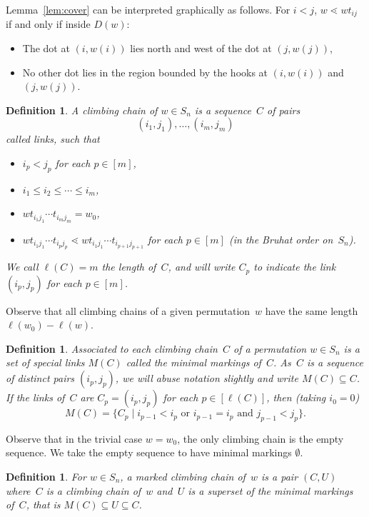 \documentclass[10pt,a4paper]{amsart}
\newtheorem{definition}[theorem]{Definition}
\begin{document}
Lemma~\ref{lem:cover} can be interpreted graphically as follows. For $i<j$, $w\lessdot wt_{ij}$ if and only if inside $D(w)$:
\begin{itemize}
	\item The dot at $(i,w(i))$ lies north and west of the dot at $(j,w(j))$,
	\item No other dot lies in the region bounded by the hooks at $(i,w(i))$ and $(j,w(j))$.
\end{itemize}

\setcounter{section}{4}\setcounter{theorem}{2}
\begin{definition}
	A \emph{climbing chain} of $w\in S_n$ is a sequence~$C$ of pairs 
	\[(i_1,j_1),\ldots,(i_m,j_m)\]
	called \emph{links}, such that 
	\begin{itemize}
		\item $i_p<j_p$ for each $p\in [m]$, 
		\item $i_1\leq i_2\leq \cdots \leq i_m$,
		\item $wt_{i_1j_1}\cdots t_{i_mj_m} = w_0$,
		\item $wt_{i_1j_1}\cdots t_{i_pj_p} \lessdot wt_{i_1j_1}\cdots t_{i_{p+1}j_{p+1}}$ for each $p\in [m]$ (in the Bruhat order on~$S_n$).
	\end{itemize}
	We call $\ell(C)=m$ the \emph{length} of~$C$, and will write $C_p$ to indicate the link $(i_p,j_p)$ for each $p\in [m]$.
\end{definition}

Observe that all climbing chains of a given permutation~$w$ have the same length $\ell(w_0)-\ell(w)$.

\setcounter{section}{4}\setcounter{theorem}{4}
\begin{definition}
	Associated to each climbing chain~$C$ of a permutation $w\in S_n$ is a set of special links $M(C)$ called the \emph{minimal markings} of~$C$. As~$C$ is a sequence of distinct pairs $(i_p,j_p)$, we will abuse notation slightly and write $M(C)\subseteq C$. If the links of~$C$ are $C_p=(i_p,j_p)$ for each $p\in [\ell(C)]$, then (taking $i_0=0$)
	\[M(C)=\{C_p \mid i_{p-1}<i_{p} \mbox{ or } i_{p-1}=i_p \mbox{ and } j_{p-1}<j_p\}. \]
\end{definition}

Observe that in the trivial case $w=w_0$, the only climbing chain is the empty sequence. We take the empty sequence to have minimal markings $\emptyset$.

\setcounter{section}{4}\setcounter{theorem}{6}
\begin{definition}
	For $w\in S_n$, a \emph{marked climbing chain} of~$w$ is a pair $(C,U)$ where~$C$ is a climbing chain of~$w$ and~$U$ is a superset of the minimal markings of~$C$, that is $M(C)\subseteq U\subseteq C$.
\end{definition}
\end{document}
